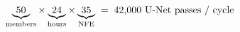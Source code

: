 \documentclass[border=10pt,varwidth=\maxdimen]{standalone}
\begin{document}
\(\displaystyle \underbrace{50}_{\text{members}} \times \underbrace{24}_{\text{hours}} \times \underbrace{35}_{\text{NFE}} \;=\; 42{,}000 \ \text{U\text{-}Net passes / cycle} \)
\end{document}
